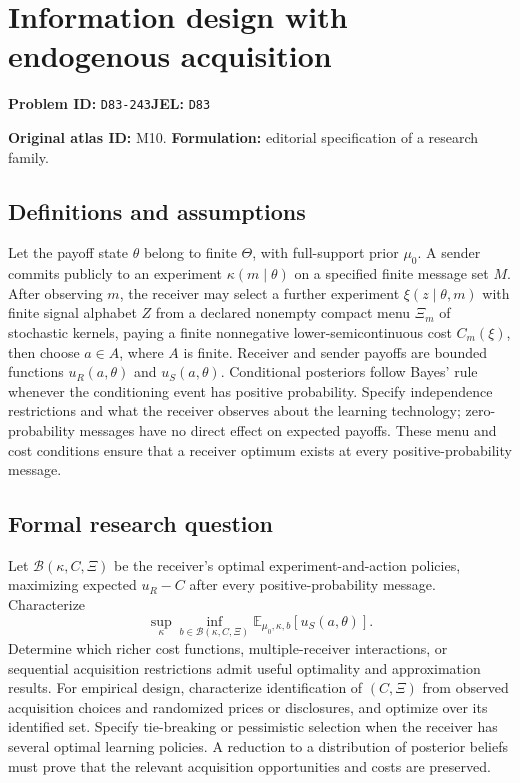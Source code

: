 \documentclass[11pt,a4paper]{article}
\begin{document}
\section*{Information design with endogenous acquisition}
\textbf{Problem ID:} \texttt{D83-243}\quad \textbf{JEL:} \texttt{D83}\par
\label{problem:OP-0010}
\label{atlas:prob:M10}

\noindent\textbf{Original atlas ID:} M10. \textbf{Formulation:} editorial specification of a research family.

\subsection*{Definitions and assumptions}

Let the payoff state $\theta$ belong to finite $\Theta$, with full-support prior $\mu_0$. A sender commits publicly to an experiment $\kappa(m\mid\theta)$ on a specified finite message set $M$. After observing $m$, the receiver may select a further experiment $\xi(z\mid\theta,m)$ with finite signal alphabet $Z$ from a declared nonempty compact menu $\Xi_m$ of stochastic kernels, paying a finite nonnegative lower-semicontinuous cost $C_m(\xi)$, then choose $a\in A$, where $A$ is finite. Receiver and sender payoffs are bounded functions $u_R(a,\theta)$ and $u_S(a,\theta)$. Conditional posteriors follow Bayes' rule whenever the conditioning event has positive probability. Specify independence restrictions and what the receiver observes about the learning technology; zero-probability messages have no direct effect on expected payoffs. These menu and cost conditions ensure that a receiver optimum exists at every positive-probability message.

\subsection*{Formal research question}

Let $\mathcal B(\kappa,C,\Xi)$ be the receiver's optimal experiment-and-action policies, maximizing expected $u_R-C$ after every positive-probability message. Characterize
\[
\sup_\kappa\inf_{b\in\mathcal B(\kappa,C,\Xi)}
 \mathbb E_{\mu_0,\kappa,b}[u_S(a,\theta)].
\]
Determine which richer cost functions, multiple-receiver interactions, or sequential acquisition restrictions admit useful optimality and approximation results. For empirical design, characterize identification of $(C,\Xi)$ from observed acquisition choices and randomized prices or disclosures, and optimize over its identified set. Specify tie-breaking or pessimistic selection when the receiver has several optimal learning policies. A reduction to a distribution of posterior beliefs must prove that the relevant acquisition opportunities and costs are preserved.
\end{document}
